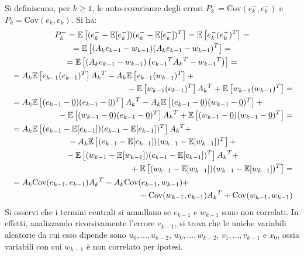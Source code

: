 \documentclass[12pt,a4paper,openright,twoside]{book}
\begin{document}
Si definiscano, per $k\geq 1$, le auto-covarianze degli errori $P_k^-=\mathrm{Cov}(e_k^-,e_k^-)$ e $P_k=\mathrm{Cov}(e_k,e_k)$. Si ha:
\begin{gather*}
P_k^-=\mathbb{E}\left[(e_k^--\mathbb{E}[e_k^-])(e_k^--\mathbb{E}[e_k^-])^T\right]=\mathbb{E}\left[e_k^-(e_k^-)^T\right]= \\
=\mathbb{E}\left[(A_ke_{k-1}-w_{k-1})(A_ke_{k-1}-w_{k-1})^T\right]= \\
=\mathbb{E}\left[(A_ke_{k-1}-w_{k-1})\left({e_{k-1}}^T{A_k}^T-{w_{k-1}}^T\right)\right]= \\
\begin{multlined}[\textwidth]
=A_k\mathbb{E}\left[e_{k-1}(e_{k-1})^T\right]{A_k}^T-A_k\mathbb{E}\left[e_{k-1}(w_{k-1})^T\right]+ \\
-\mathbb{E}\left[w_{k-1}(e_{k-1})^T\right]{A_k}^T+\mathbb{E}\left[w_{k-1}(w_{k-1})^T\right]=
\end{multlined} \\
\begin{multlined}[\textwidth]
=A_k\mathbb{E}\left[(e_{k-1}-\underline{0})(e_{k-1}-\underline{0})^T\right]{A_k}^T-A_k\mathbb{E}\left[(e_{k-1}-\underline{0})(w_{k-1}-\underline{0})^T\right]+ \\
-\mathbb{E}\left[(w_{k-1}-\underline{0})(e_{k-1}-\underline{0})^T\right]{A_k}^T+\mathbb{E}\left[(w_{k-1}-\underline{0})(w_{k-1}-\underline{0})^T\right]=
\end{multlined} \\
\begin{multlined}[\textwidth]
=A_k\mathbb{E}\left[(e_{k-1}-\mathbb{E}[e_{k-1}])(e_{k-1}-\mathbb{E}[e_{k-1}])^T\right]{A_k}^T+ \\
-A_k\mathbb{E}\left[(e_{k-1}-\mathbb{E}[e_{k-1}])(w_{k-1}-\mathbb{E}[w_{k-1}])^T\right]+ \\
-\mathbb{E}\left[(w_{k-1}-\mathbb{E}[w_{k-1}])(e_{k-1}-\mathbb{E}[e_{k-1}])^T\right]{A_k}^T+ \\
+\mathbb{E}\left[(w_{k-1}-\mathbb{E}[w_{k-1}])(w_{k-1}-\mathbb{E}[w_{k-1}])^T\right]=
\end{multlined} \\
\begin{multlined}[\textwidth]
=A_k\mathrm{Cov}(e_{k-1},e_{k-1}){A_k}^T-A_k\mathrm{Cov}(e_{k-1},w_{k-1})+ \\
-\mathrm{Cov}(w_{k-1},e_{k-1}){A_k}^T+\mathrm{Cov}(w_{k-1},w_{k-1})
\end{multlined}
\end{gather*}
Si osservi che i termini centrali si annullano se $e_{k-1}$ e $w_{k-1}$ sono non correlati. In effetti, analizzando ricorsivamente l'errore $e_{k-1}$, si trova che le uniche variabili aleatorie da cui esso dipende sono $u_0,...,u_{k-2}$, $w_0,...,w_{k-2}$, $v_1,...,v_{k-1}$ e $x_0$, ossia variabili con cui $w_{k-1}$ è non correlato per ipotesi. \\
\end{document}
